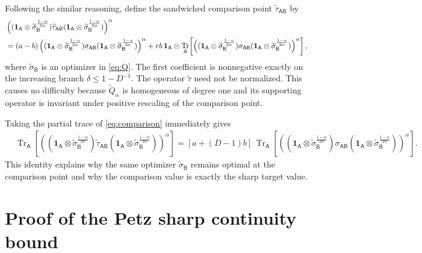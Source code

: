 \documentclass[11pt,reqno]{amsart}
\theoremstyle{definition}
\DeclareMathOperator{\Tr}{Tr}
\newcommand{\I}{\mathbf 1}
\newcommand{\A}{\mathsf{A}}
\newcommand{\B}{\mathsf{B}}
\newcommand{\sand}{\widetilde}
\begin{document}
Following the similar reasoning, define the sandwiched comparison point
$\sand\tau_{\A\B}$ by
\begin{align}
&\left(
(\I_{\A}\otimes\sand\sigma_{\B}^{\frac{1-\alpha}{2\alpha}})
\sand\tau_{\A\B}
(\I_{\A}\otimes\sand\sigma_{\B}^{\frac{1-\alpha}{2\alpha}})
\right)^{\alpha}
\notag\\
&=(a-b)
\left(
(\I_{\A}\otimes\sand\sigma_{\B}^{\frac{1-\alpha}{2\alpha}})
\sigma_{\A\B}
(\I_{\A}\otimes\sand\sigma_{\B}^{\frac{1-\alpha}{2\alpha}})
\right)^{\alpha}
+
rb\,\I_{\A}\otimes
\Tr_{\A}\!\left[\left(
(\I_{\A}\otimes\sand\sigma_{\B}^{\frac{1-\alpha}{2\alpha}})
\sigma_{\A\B}
(\I_{\A}\otimes\sand\sigma_{\B}^{\frac{1-\alpha}{2\alpha}})
\right)^{\alpha}\right],
\label{eq:comparison}
\end{align}
where
$\sand\sigma_{\B}$ is an optimizer in \cref{eq:Q}.
The first coefficient is nonnegative exactly on the increasing branch
$\delta\leq1-D^{-1}$.  The operator $\sand\tau$ need not be normalized.
This causes no difficulty because $\sand Q_{\alpha}$ is homogeneous of
degree one and its supporting operator is invariant under positive rescaling
of the comparison point.

Taking the partial trace of \cref{eq:comparison} immediately gives
\begin{align}
&\Tr_{\A}\!\left[\left(
(\I_{\A}\otimes\sand\sigma_{\B}^{\frac{1-\alpha}{2\alpha}})
\sand\tau_{\A\B}
(\I_{\A}\otimes\sand\sigma_{\B}^{\frac{1-\alpha}{2\alpha}})
\right)^{\alpha}\right]
=
[a+(D-1)b]\,\Tr_{\A}\!\left[\left(
(\I_{\A}\otimes\sand\sigma_{\B}^{\frac{1-\alpha}{2\alpha}})
\sigma_{\A\B}
(\I_{\A}\otimes\sand\sigma_{\B}^{\frac{1-\alpha}{2\alpha}})
\right)^{\alpha}\right].
 \label{eq:comparison-marginal}
\end{align}
This identity explains why the same optimizer $\sand\sigma_{\B}$ remains
optimal at the comparison point and why the comparison value is exactly the
sharp target value.



\section{Proof of the Petz sharp continuity bound}\label{sec:main-proof}
\end{document}
